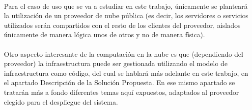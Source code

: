 \documentclass[../../memoria.tex]{subfiles}
\begin{document}
\paragraph{}
Para el caso de uso que se va a estudiar en este trabajo, únicamente se planteará la utilización de un proveedor de nube pública (es decir, los servidores o servicios utilizados serán compartidos con el resto de los clientes del proveedor, aislados únicamente de manera lógica unos de otros y no de manera física).

\paragraph{}
Otro aspecto interesante de la computación en la nube es que (dependiendo del proveedor) la infraestructura puede ser gestionada utilizando el modelo de infraestructura como código, del cual se hablará más adelante en este trabajo, en el apartado Descripción de la Solución Propuesta. En ese mismo apartado se tratarán más a fondo diferentes temas aquí expuestos, adaptados al proveedor elegido para el despliegue del sistema.
\end{document}
